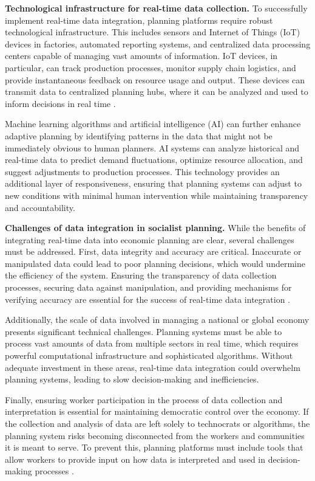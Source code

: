\begin{refsection}
\textbf{Technological infrastructure for real-time data collection.} To successfully implement real-time data integration, planning platforms require robust technological infrastructure. This includes sensors and Internet of Things (IoT) devices in factories, automated reporting systems, and centralized data processing centers capable of managing vast amounts of information. IoT devices, in particular, can track production processes, monitor supply chain logistics, and provide instantaneous feedback on resource usage and output. These devices can transmit data to centralized planning hubs, where it can be analyzed and used to inform decisions in real time \cite[pp.~67]{mitchell2018cybernetic}.

Machine learning algorithms and artificial intelligence (AI) can further enhance adaptive planning by identifying patterns in the data that might not be immediately obvious to human planners. AI systems can analyze historical and real-time data to predict demand fluctuations, optimize resource allocation, and suggest adjustments to production processes. This technology provides an additional layer of responsiveness, ensuring that planning systems can adjust to new conditions with minimal human intervention while maintaining transparency and accountability.

\textbf{Challenges of data integration in socialist planning.} While the benefits of integrating real-time data into economic planning are clear, several challenges must be addressed. First, data integrity and accuracy are critical. Inaccurate or manipulated data could lead to poor planning decisions, which would undermine the efficiency of the system. Ensuring the transparency of data collection processes, securing data against manipulation, and providing mechanisms for verifying accuracy are essential for the success of real-time data integration \cite[pp.~145]{restakis2012humanizing}.

Additionally, the scale of data involved in managing a national or global economy presents significant technical challenges. Planning systems must be able to process vast amounts of data from multiple sectors in real time, which requires powerful computational infrastructure and sophisticated algorithms. Without adequate investment in these areas, real-time data integration could overwhelm planning systems, leading to slow decision-making and inefficiencies.

Finally, ensuring worker participation in the process of data collection and interpretation is essential for maintaining democratic control over the economy. If the collection and analysis of data are left solely to technocrats or algorithms, the planning system risks becoming disconnected from the workers and communities it is meant to serve. To prevent this, planning platforms must include tools that allow workers to provide input on how data is interpreted and used in decision-making processes \cite[pp.~209]{devine2020democracy}.


\end{refsection}
